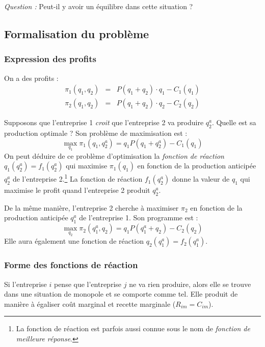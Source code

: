 \documentclass[
  a4paper,
]{book}
\theoremstyle{definition}
\theoremstyle{definition}
\theoremstyle{definition}
\theoremstyle{definition}
\theoremstyle{remark}
\begin{document}
\emph{Question :} Peut-il y avoir un équilibre dans cette situation ?

\hypertarget{formalisation-du-probluxe8me}{%
\subsection{Formalisation du problème}\label{formalisation-du-probluxe8me}}

\hypertarget{expression-des-profits}{%
\subsubsection{Expression des profits}\label{expression-des-profits}}

On a des profits :
\[
\begin{array}{rcl}
\pi_1(q_1, q_2) &=& P(q_1+q_2)\cdot q_1-C_1(q_1)\\
\pi_2(q_1, q_2) &=& P(q_1+q_2)\cdot q_2-C_2(q_2)
\end{array}
\label{eq:profitcournot}
\]

Supposons que l'entreprise 1 \emph{croit} que l'entreprise 2 va produire \(q_2^a\).
Quelle est sa production optimale ?
Son problème de maximisation est :
\[
\max_{q_1} \pi_1(q_1, q_2^a) =  q_1P(q_1+q_2^a)-C_1(q_1)
\]
On peut déduire de ce problème d'optimisation la \emph{fonction de réaction} \(q_1(q_2^a)=f_1(q_2^a)\) qui maximise \(\pi_1(q_1)\) en fonction de la production anticipée \(q_2^a\) de l'entreprise 2.\footnote{La fonction de réaction est parfois aussi connue sous le nom de \emph{fonction de meilleure réponse}.}
La fonction de réaction \(f_1(q_2^a)\) donne la valeur de \(q_1\) qui maximise le profit quand l'entreprise 2 produit \(q_2^a\).

De la même manière, l'entreprise 2 cherche à maximiser \(\pi_2\) en fonction de la production anticipée \(q_1^a\) de l'entreprise 1.
Son programme est :
\[
\max_{q_2} \pi_2(q_1^a, q_2) =  q_1P(q_1^a+q_2)-C_2(q_2)
\]
Elle aura également une fonction de réaction \(q_2(q_1^a)=f_2(q_1^a)\).

\hypertarget{forme-des-fonctions-de-ruxe9action}{%
\subsubsection{Forme des fonctions de réaction}\label{forme-des-fonctions-de-ruxe9action}}

Si l'entreprise \(i\) pense que l'entreprise \(j\) ne va rien produire, alors elle se trouve dans une situation de monopole et se comporte comme tel.
Elle produit de manière à égaliser coût marginal et recette marginale (\(R_{im}=C_{im}\)).
\end{document}
